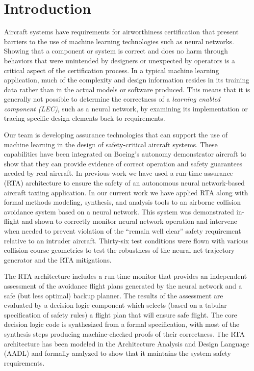 \section{Introduction}

Aircraft systems have requirements for airworthiness certification that present barriers to the use
of machine learning technologies such as neural networks. Showing that a component or system is
correct and does no harm through behaviors that were unintended by designers or unexpected by
operators is a critical aspect of the certification process. In a typical machine learning
application, much of the complexity and design information resides in its training data rather than
in the actual models or software produced. This means that it is generally not possible to determine
the correctness of a {\em learning enabled component (LEC)}, such as a neural network, 
by examining its implementation or tracing specific design
elements back to requirements.

Our team is developing assurance technologies that can support the use of machine learning in the
design of safety-critical aircraft systems. These capabilities have been integrated on Boeing's
autonomy demonstrator aircraft to show that they can provide evidence of correct operation and
safety guarantees needed by real aircraft. In previous work \cite{dasc2020} we have used a run-time assurance
(RTA) architecture to ensure the safety of an autonomous neural network-based aircraft taxiing
application. In our current work we have applied RTA along with formal methods
modeling, synthesis, and analysis tools to an airborne collision avoidance system based on a neural network.
This system was demonstrated in-flight and shown to correctly monitor neural network operation and
intervene when needed to prevent violation of the ``remain well clear'' safety requirement relative to
an intruder aircraft. Thirty-six test conditions were flown with various collision course
geometries
to test the robustness of the neural net trajectory generator and
the RTA mitigations.

The RTA architecture includes a run-time monitor that provides an independent assessment of the
avoidance flight plans generated by the neural network and a safe (but less optimal) backup planner.
The results of the assessment are evaluated by a decision logic component which selects (based on a
tabular specification of safety rules) a flight plan that will ensure safe flight. The core decision
logic code is synthesized from a formal specification, with most of the synthesis steps producing
machine-checked proofs of their correctness. The RTA architecture has been modeled in the
Architecture Analysis and Design Language (AADL) and formally analyzed to show that it maintains the
system safety requirements.

